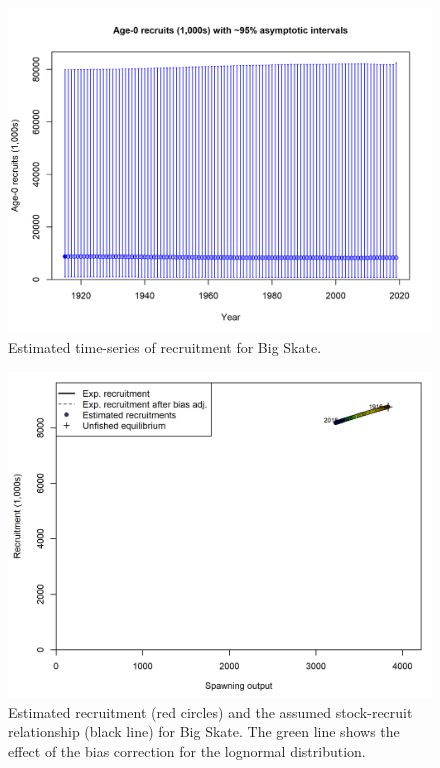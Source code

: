 \documentclass[12pt,]{article}
\begin{document}
\FloatBarrier

\begin{figure}
\centering
\includegraphics{r4ss/plots_mod1/ts11_Age-0_recruits_(1000s)_with_95_asymptotic_intervals.png}
\caption{Estimated time-series of recruitment for Big Skate.
\label{fig:ts11_Age-0_recruits_(1000s)_with_95_asymptotic_intervals}}
\end{figure}

\begin{figure}
\centering
\includegraphics{r4ss/plots_mod1/SR_curve2.png}
\caption{Estimated recruitment (red circles) and the assumed
stock-recruit relationship (black line) for Big Skate. The green line
shows the effect of the bias correction for the lognormal distribution.
\label{fig:SR_curve2}}
\end{figure}
\end{document}
